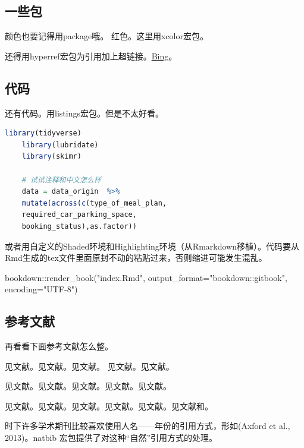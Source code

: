 \documentclass{ctexart}
\theoremstyle{plain} 		     %
\theoremstyle{definition} 		 %
\theoremstyle{remark} 			 %
\newenvironment{Shaded}{\begin{snugshade}}{\end{snugshade}}
\newcommand{\AttributeTok}[1]{\textcolor[rgb]{0.77,0.63,0.00}{#1}}
\newcommand{\FunctionTok}[1]{\textcolor[rgb]{0.00,0.00,0.00}{#1}}
\newcommand{\NormalTok}[1]{#1}
\newcommand{\SpecialCharTok}[1]{\textcolor[rgb]{0.00,0.00,0.00}{#1}}
\newcommand{\StringTok}[1]{\textcolor[rgb]{0.31,0.60,0.02}{#1}}
\begin{document}
\subsection{一些包}
颜色也要记得用package哦。{\color{red} 红色}。这里用xcolor宏包。

还得用hyperref宏包为引用加上超链接。\href{bing.com}{Bing}。

\subsection{代码}
还有代码。用listings宏包。但是不太好看。
\begin{lstlisting}[language=R]
	library(tidyverse)
	library(lubridate)
	library(skimr)
	
	# 试试注释和中文怎么样
	data = data_origin  %>% 
	mutate(across(c(type_of_meal_plan,
	required_car_parking_space,
	booking_status),as.factor))
\end{lstlisting}

或者用自定义的Shaded环境和Highlighting环境（从Rmarkdown移植）。代码要从Rmd生成的tex文件里面原封不动的粘贴过来，否则缩进可能发生混乱。
\begin{Shaded}
\begin{Highlighting}[]
\NormalTok{bookdown}\SpecialCharTok{::}\FunctionTok{render\_book}\NormalTok{(}\StringTok{"index.Rmd"}\NormalTok{, }
	\AttributeTok{output\_format=}\StringTok{"bookdown::gitbook"}\NormalTok{, }\AttributeTok{encoding=}\StringTok{"UTF{-}8"}\NormalTok{)}
\end{Highlighting}
\end{Shaded}


\subsection{参考文献}
再看看下面参考文献怎么整。

见文献\cite{sun}。见文献\citeauthor{sun}。见文献\citeyear{sun}。
见文献\textcite{sun}。见文献\parencite{sun}。

见文献\cite{zhang__2019}。见文献\citeauthor{zhang__2019}。见文献\citeyear{zhang__2019}。见文献\textcite{zhang__2019}。见文献\parencite{zhang__2019}。

见文献\cite{Blakeley}。见文献\citeauthor{Blakeley}。见文献\citeyear{Blakeley}。见文献\textcite{Blakeley}。见文献\parencite{Blakeley}。见文献\cite{sun,zhang__2019,Blakeley}和\citeauthor{sun,zhang__2019,Blakeley}。

时下许多学术期刊比较喜欢使用人名——年份的引用方式，形如(Axford et al., 2013)。natbib
宏包提供了对这种“自然”引用方式的处理。
\end{document}

